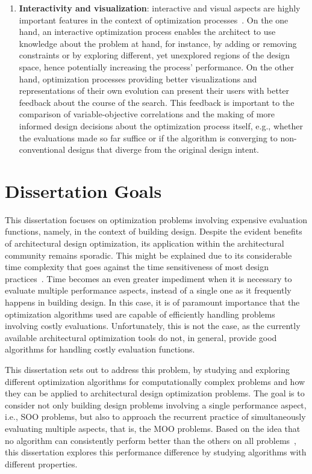 \begin{enumerate}
\item \textbf{Interactivity and visualization}: interactive and visual aspects are highly important features in the context of optimization processes~\cite{Ashour2015CreativelyMOO}. On the one hand, an interactive optimization process enables the architect to use knowledge about the problem at hand, for instance, by adding or removing constraints or by exploring different, yet unexplored regions of the design space, hence potentially increasing the process' performance. On the other hand, optimization processes providing better visualizations and representations of their own evolution can present their users with better feedback about the course of the search. This feedback is important to the comparison of variable-objective correlations and the making of more informed design decisions about the optimization process itself, e.g., whether the evaluations made so far suffice or if the algorithm is converging to non-conventional designs that diverge from the original design intent.
\end{enumerate}

\section{Dissertation Goals}
\label{sec:goals}

This dissertation focuses on optimization problems involving expensive evaluation functions, namely, in the context of building design. Despite the evident benefits of architectural design optimization, its application within the architectural community remains sporadic. This might be explained due to its considerable time complexity that goes against the time sensitiveness of most design practices~\cite{Shi2016}. Time becomes an even greater impediment when it is necessary to evaluate multiple performance aspects, instead of a single one as it frequently happens in building design. In this case, it is of paramount importance that the optimization algorithms used are capable of efficiently handling problems involving costly evaluations. Unfortunately, this is not the case, as the currently available architectural optimization tools do not, in general, provide good algorithms for handling costly evaluation functions.

This dissertation sets out to address this problem, by studying and exploring different optimization algorithms for computationally complex problems and how they can be applied to architectural design optimization problems. The goal is to consider not only building design problems involving a single performance aspect, i.e., \ac{SOO} problems, but also to approach the recurrent practice of simultaneously evaluating multiple aspects, that is, the \ac{MOO} problems. Based on the idea that no algorithm can consistently perform better than the others on all problems~\cite{Wolpert1997NFLT}, this dissertation explores this performance difference by studying algorithms with different properties. 

